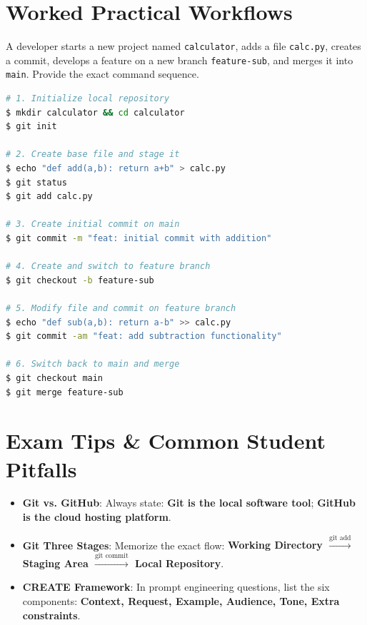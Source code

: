 \section{Worked Practical Workflows}

\begin{example}
A developer starts a new project named \texttt{calculator}, adds a file \texttt{calc.py}, creates a commit, develops a feature on a new branch \texttt{feature-sub}, and merges it into \texttt{main}. Provide the exact command sequence.

\begin{solutionbox}
\begin{lstlisting}[language=bash]
# 1. Initialize local repository
$ mkdir calculator && cd calculator
$ git init

# 2. Create base file and stage it
$ echo "def add(a,b): return a+b" > calc.py
$ git status
$ git add calc.py

# 3. Create initial commit on main
$ git commit -m "feat: initial commit with addition"

# 4. Create and switch to feature branch
$ git checkout -b feature-sub

# 5. Modify file and commit on feature branch
$ echo "def sub(a,b): return a-b" >> calc.py
$ git commit -am "feat: add subtraction functionality"

# 6. Switch back to main and merge
$ git checkout main
$ git merge feature-sub
\end{lstlisting}
\end{solutionbox}
\end{example}

\section{Exam Tips \& Common Student Pitfalls}

\begin{examtip}
\begin{itemize}
    \item \textbf{Git vs. GitHub}: Always state: \textbf{Git is the local software tool}; \textbf{GitHub is the cloud hosting platform}.
    \item \textbf{Git Three Stages}: Memorize the exact flow: \textbf{Working Directory $\xrightarrow{\text{git add}}$ Staging Area $\xrightarrow{\text{git commit}}$ Local Repository}.
    \item \textbf{CREATE Framework}: In prompt engineering questions, list the six components: \textbf{Context, Request, Example, Audience, Tone, Extra constraints}.
\end{itemize}
\end{examtip}


